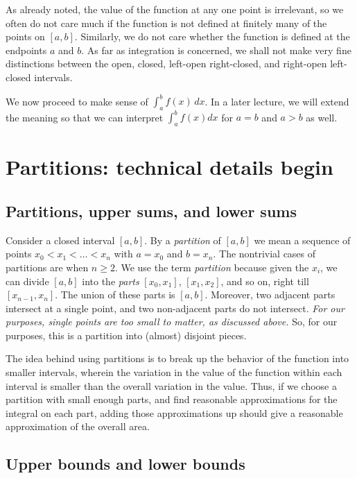 \documentclass{amsart}
\begin{document}
As already noted, the value of the function at any one point is
irrelevant, so we often do not care much if the function is not
defined at finitely many of the points on $[a,b]$. Similarly, we do
not care whether the function is defined at the endpoints $a$ and
$b$. As far as integration is concerned, we shall not make very fine
distinctions between the open, closed, left-open right-closed, and
right-open left-closed intervals.

We now proceed to make sense of $\int_a^b f(x) \, dx$. In a later
lecture, we will extend the meaning so that we can interpret $\int_a^b
f(x) dx$ for $a = b$ and $a > b$ as well.

\section{Partitions: technical details begin}

\subsection{Partitions, upper sums, and lower sums}

Consider a closed interval $[a,b]$. By a {\em partition} of $[a,b]$ we
mean a sequence of points $x_0 < x_1 < \dots < x_n$ with $a = x_0$ and
$b = x_n$. The nontrivial cases of partitions are when $n \ge 2$. We
use the term {\em partition} because given the $x_i$, we can divide
$[a,b]$ into the {\em parts} $[x_0,x_1]$, $[x_1,x_2]$, and so on,
right till $[x_{n-1},x_n]$. The union of these parts is
$[a,b]$. Moreover, two adjacent parts intersect at a single point, and
two non-adjacent parts do not intersect. {\em For our purposes, single
points are too small to matter, as discussed above.} So, for our
purposes, this is a partition into (almost) disjoint pieces.

The idea behind using partitions is to break up the behavior of the
function into smaller intervals, wherein the variation in the value of
the function within each interval is smaller than the overall
variation in the value. Thus, if we choose a partition with small
enough parts, and find reasonable approximations for the integral on
each part, adding those approximations up should give a reasonable
approximation of the overall area.

\subsection{Upper bounds and lower bounds}
\end{document}
